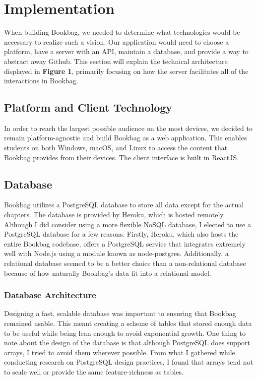 \documentclass[pageno]{jpaper}
\begin{document}
\section{Implementation} \label{implementation}


When building Bookbag, we needed to determine what technologies would be necessary to realize such a vision. Our application would need to choose a platform, have a server with an API, maintain a database, and provide a way to abstract away Github. This section will explain the technical architecture displayed in \textbf{Figure 1}, primarily focusing on how the server facilitates all of the interactions in Bookbag.

\subsection{Platform and Client Technology}

In order to reach the largest possible audience on the most devices, we decided to remain platform-agnostic and build Bookbag as a web application. This enables students on both Windows, macOS, and Linux to access the content that Bookbag provides from their devices. The client interface is built in ReactJS.

\subsection{Database}

Bookbag utilizes a PostgreSQL database to store all data except for the actual chapters. The database is provided by Heroku, which is hosted remotely. Although I did consider using a more flexible NoSQL database, I elected to use a PostgreSQL database for a few reasons. Firstly, Heroku, which also hosts the entire Bookbag codebase, offers a PostgreSQL service that integrates extremely well with Node.js using a module known as node-postgres. Additionally, a relational database seemed to be a better choice than a non-relational database because of how naturally Bookbag's data fit into a relational model. 

\subsubsection{Database Architecture}

Designing a fast, scalable database was important to ensuring that Bookbag remained usable. This meant creating a scheme of tables that stored enough data to be useful while being lean enough to avoid exponential growth. One thing to note about the design of the database is that although PostgreSQL does support arrays, I tried to avoid them wherever possible. From what I gathered while conducting research on PostgreSQL design practices, I found that arrays tend not to scale well or provide the same feature-richness as tables.
\end{document}
